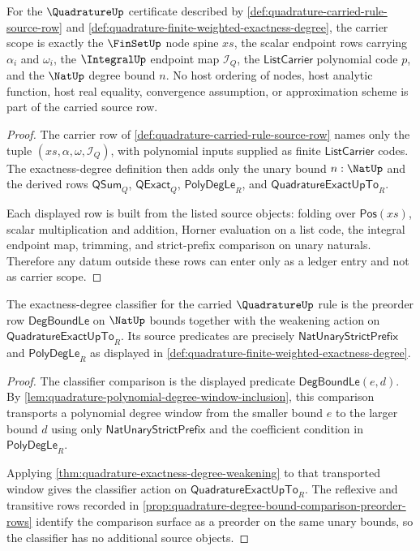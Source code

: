 \begin{theorem}
\label{thm:quadrature-carrier-scope-obligation}
For the $\QuadratureUp$ certificate described by \autoref{def:quadrature-carried-rule-source-row} and \autoref{def:quadrature-finite-weighted-exactness-degree}, the carrier scope is exactly the $\FinSetUp$ node spine $xs$, the scalar endpoint rows carrying $\alpha_i$ and $\omega_i$, the $\IntegralUp$ endpoint map $\mathcal I_Q$, the $\mathsf{ListCarrier}$ polynomial code $p$, and the $\NatUp$ degree bound $n$. No host ordering of nodes, host analytic function, host real equality, convergence assumption, or approximation scheme is part of the carried source row.
\end{theorem}
\begin{proof}
The carrier row of \autoref{def:quadrature-carried-rule-source-row} names only the tuple $(xs,\alpha,\omega,\mathcal I_Q)$, with polynomial inputs supplied as finite $\mathsf{ListCarrier}$ codes. The exactness-degree definition then adds only the unary bound $n:\NatUp$ and the derived rows $\mathsf{QSum}_Q$, $\mathsf{QExact}_Q$, $\mathsf{PolyDegLe}_R$, and $\mathsf{QuadratureExactUpTo}_R$.

Each displayed row is built from the listed source objects: folding over $\mathsf{Pos}(xs)$, scalar multiplication and addition, Horner evaluation on a list code, the integral endpoint map, trimming, and strict-prefix comparison on unary naturals. Therefore any datum outside these rows can enter only as a ledger entry and not as carrier scope.
\end{proof}

\begin{theorem}
\label{thm:quadrature-classifier-scope-obligation}
The exactness-degree classifier for the carried $\QuadratureUp$ rule is the preorder row $\mathsf{DegBoundLe}$ on $\NatUp$ bounds together with the weakening action on $\mathsf{QuadratureExactUpTo}_R$. Its source predicates are precisely $\mathsf{NatUnaryStrictPrefix}$ and $\mathsf{PolyDegLe}_R$ as displayed in \autoref{def:quadrature-finite-weighted-exactness-degree}.
\end{theorem}
\begin{proof}
The classifier comparison is the displayed predicate $\mathsf{DegBoundLe}(e,d)$. By \autoref{lem:quadrature-polynomial-degree-window-inclusion}, this comparison transports a polynomial degree window from the smaller bound $e$ to the larger bound $d$ using only $\mathsf{NatUnaryStrictPrefix}$ and the coefficient condition in $\mathsf{PolyDegLe}_R$.

Applying \autoref{thm:quadrature-exactness-degree-weakening} to that transported window gives the classifier action on $\mathsf{QuadratureExactUpTo}_R$. The reflexive and transitive rows recorded in \autoref{prop:quadrature-degree-bound-comparison-preorder-rows} identify the comparison surface as a preorder on the same unary bounds, so the classifier has no additional source objects.
\end{proof}

